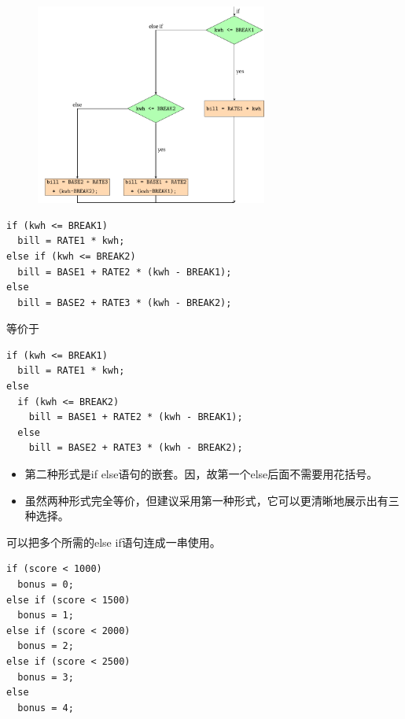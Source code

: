 \begin{frame}[fragile]
\begin{figure}
\centering
\includegraphics[width=3in]{ch07/images/elseif.pdf}
\end{figure}

\end{frame}


\begin{frame}[fragile]
\begin{lstlisting}
if (kwh <= BREAK1)
  bill = RATE1 * kwh;
else if (kwh <= BREAK2)
  bill = BASE1 + RATE2 * (kwh - BREAK1);
else
  bill = BASE2 + RATE3 * (kwh - BREAK2);
\end{lstlisting}
等价于
\begin{lstlisting}
if (kwh <= BREAK1)
  bill = RATE1 * kwh;
else 
  if (kwh <= BREAK2)
    bill = BASE1 + RATE2 * (kwh - BREAK1);
  else
    bill = BASE2 + RATE3 * (kwh - BREAK2);
\end{lstlisting}
\end{frame}


\begin{frame}[fragile]
\begin{itemize}
\item
第二种形式是if else语句的嵌套。因，故第一个else后面不需要用花括号。\\[0.1in]
\item 
虽然两种形式完全等价，但建议采用第一种形式，它可以更清晰地展示出有三种选择。
\end{itemize}
\end{frame}


\begin{frame}[fragile]
可以把多个所需的else if语句连成一串使用。
\begin{lstlisting}
if (score < 1000)
  bonus = 0;
else if (score < 1500)
  bonus = 1;
else if (score < 2000)
  bonus = 2;
else if (score < 2500)
  bonus = 3;
else
  bonus = 4;    
\end{lstlisting}
\end{frame}

